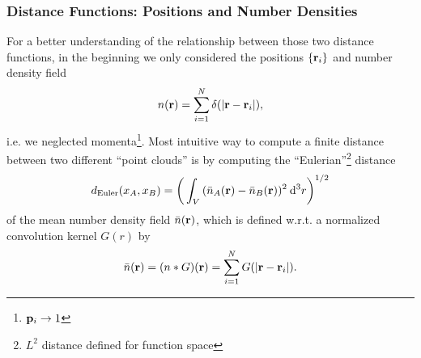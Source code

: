 \documentclass[9pt, english]{beamer}
\renewcommand{\d}{\mathrm{d}}
\begin{document}

\begin{frame}
\frametitle{Distance Functions: Positions and Number Densities}
For a better understanding of the relationship between those two distance functions,
in the beginning we only considered the positions \(\{\vb{r}_i\}\) and number density field 
\begin{equation}
 n(\vb{r}) = \sum_{i=1}^N{\delta(\lvert \vb{r} - \vb{r}_i \rvert)},
\end{equation}
i.e. we neglected momenta\footnote{\(\vb{p}_i \rightarrow 1\)}.
Most intuitive way to compute a finite distance between two different ``point clouds'' is by
computing the ``Eulerian''\footnote{\(L^2\) distance defined for function space} distance
\begin{equation}
 d_{\text{Euler}}(x_A,x_B) = \bigg( \int_V{(\bar{n}_A(\vb{r})-\bar{n}_B(\vb{r}))^2 \: \d^3 r} \bigg)^{1/2}
\end{equation}
of the mean number density field \(\bar{n}(\vb{r})\), which is defined w.r.t. a normalized convolution kernel \(G(r)\) by 
\begin{equation}
 \bar{n}(\vb{r}) = (n * G)(\vb{r}) = \sum_{i=1}^N{G(\lvert \vb{r} - \vb{r}_i \rvert)}.
\end{equation}
\end{frame}
\end{document}
